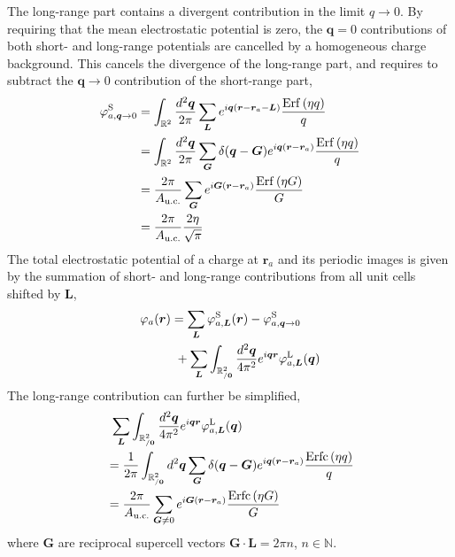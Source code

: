 \documentclass[
 reprint,
 amsmath,amssymb,
 aps, prx,
floatfix,longbibliography,
]{revtex4-2}
\begin{document}
\begin{appendix}
The long-range part contains a divergent contribution in the limit
$q\to0$. By requiring that the mean electrostatic potential is zero,
the $\bm{q}=0$ contributions of both short- and long-range potentials
are cancelled by a homogeneous charge background. This cancels the
divergence of the long-range part, and requires to subtract the $\bm{q}\to0$
contribution of the short-range part, 
\begin{align}
\varphi_{a,\bm{q}\to0}^{{\rm S}} & =\int_{\mathbb{R}^{2}}\frac{d^{2}\bm{q}}{2\pi}\sum_{\bm{L}}e^{i\bm{q}(\bm{r}-\bm{r}_{a}-\bm{L})}\frac{{\rm Erf}\left(\eta q\right)}{q}\nonumber \\
 & =\int_{\mathbb{R}^{2}}\frac{d^{2}\bm{q}}{2\pi}\sum_{\bm{G}}\delta(\bm{q}-\bm{G})e^{i\bm{q}(\bm{r}-\bm{r}_{a})}\frac{{\rm Erf}\left(\eta q\right)}{q}\nonumber \\
 & =\frac{2\pi}{A_{{\rm u.c.}}}\sum_{\bm{G}}e^{i\bm{G}(\bm{r}-\bm{r}_{a})}\frac{{\rm Erf}\left(\eta G\right)}{G}\nonumber \\
 & =\frac{2\pi}{A_{{\rm u.c.}}}\frac{2\eta}{\sqrt{\pi}}
\end{align}
The total electrostatic potential of a charge at $\bm{r}_{a}$ and
its periodic images is given by the summation of short- and long-range
contributions from all unit cells shifted by $\bm{L}$,
\begin{align}
    \varphi_{a}(\bm{r})&=\sum_{\bm{L}}\varphi_{a,\bm{L}}^{{\rm S}}(\bm{r})-\varphi_{a,\bm{q}\to0}^{{\rm S}}\nonumber \\ 
    & \  + \sum_{\bm{L}}\int_{\mathbb{R}_{/\bm{0}}^{2}}\frac{d^{2}\bm{q}}{4\pi^{2}}e^{i\bm{q}\bm{r}}\varphi_{a,\bm{L}}^{{\rm L}}(\bm{q})
\end{align}
The long-range contribution can further be simplified,
\begin{align}
& \ \sum_{\bm{L}}\int_{\mathbb{R}_{/\bm{0}}^{2}}\frac{d^{2}\bm{q}}{4\pi^{2}}e^{i\bm{q}\bm{r}}\varphi_{a,\bm{L}}^{{\rm L}}(\bm{q}) \nonumber \\
 & =\frac{1}{2\pi}\int_{\mathbb{R}_{/\bm{0}}^{2}}d^{2}\bm{q}\sum_{\bm{G}}\delta(\bm{q}-\bm{G})e^{i\bm{q}(\bm{r}-\bm{r}_{a})}\frac{{\rm Erfc}\left(\eta q\right)}{q} \nonumber\\
 & =\frac{2\pi}{A_{{\rm u.c.}}}\sum_{\bm{G}\neq0}e^{i\bm{G}(\bm{r}-\bm{r}_{a})}\frac{{\rm Erfc}\left(\eta G\right)}{G}
\end{align}
where $\bm{G}$ are reciprocal supercell vectors $\bm{G}\cdot\bm{L}=2\pi n$,
$n\in\mathbb{N}$. 


\end{appendix}
\end{document}
